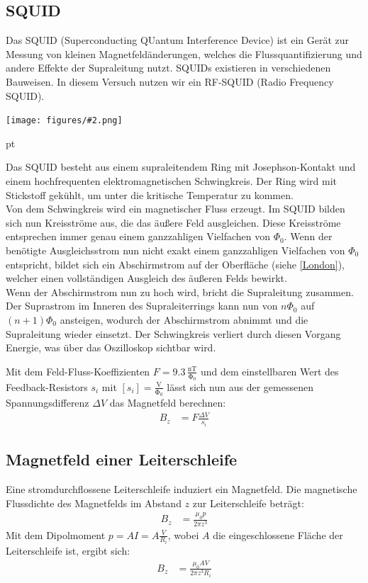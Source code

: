 \documentclass[12pt]{article}
\newcommand{\gra}[3][0.7]{
	\begin{minipage}[h!]{\textwidth}
		\centering
		\texttt{[image: figures/\#2.png]}
		\captionof{figure}{#3}
	\end{minipage}
	\vskip 30 pt
}
\begin{document}
\subsection{SQUID}
Das SQUID (Superconducting QUantum Interference Device) ist ein Gerät zur Messung von kleinen Magnetfeldänderungen, welches die Flussquantifizierung und andere Effekte der Supraleitung nutzt. SQUIDs existieren in verschiedenen Bauweisen. In diesem Versuch nutzen wir ein RF-SQUID (Radio Frequency SQUID).

\gra{squid}{Aufbau eines RF-SQUIDs}

Das SQUID besteht aus einem supraleitendem Ring mit Josephson-Kontakt und einem hochfrequenten elektromagnetischen Schwingkreis. Der Ring wird mit Stickstoff gekühlt, um unter die kritische Temperatur zu kommen.\\

Von dem Schwingkreis wird ein magnetischer Fluss erzeugt. Im SQUID bilden sich nun Kreisströme aus, die das äußere Feld ausgleichen. Diese Kreisströme entsprechen immer genau einem ganzzahligen Vielfachen von $\Phi_0$. Wenn der benötigte Ausgleichsstrom nun nicht exakt einem ganzzahligen Vielfachen von $\Phi_0$ entspricht, bildet sich ein Abschirmstrom auf der Oberfläche (siehe \ref{London}), welcher einen vollständigen Ausgleich des äußeren Felds bewirkt.\\

Wenn der Abschirmstrom nun zu hoch wird, bricht die Supraleitung zusammen. Der Suprastrom im Inneren des Supraleiterrings kann nun von $n\Phi_0$ auf $(n+1)\Phi_0$ ansteigen, wodurch der Abschirmstrom abnimmt und die Supraleitung wieder einsetzt. Der Schwingkreis verliert durch diesen Vorgang Energie, was über das Oszilloskop sichtbar wird.

Mit dem Feld-Fluss-Koeffizienten $F=9.3\,\mathrm{\frac{nT}{\Phi_0}}$ und dem einstellbaren Wert des Feedback-Resistors $s_i$ mit $[s_i]=\mathrm{\frac{V}{\Phi_0}}$ lässt sich nun aus der gemessenen Spannungsdifferenz $\Delta V$ das Magnetfeld berechnen:
\begin{align}
	B_z&=F\frac{\Delta V}{s_i}
\end{align}

\subsection{Magnetfeld einer Leiterschleife}
Eine stromdurchflossene Leiterschleife induziert ein Magnetfeld. Die magnetische Flussdichte des Magnetfelds im Abstand $z$ zur Leiterschleife beträgt:
\begin{align*}
	B_z&=\frac{\mu_0p}{2\pi z^3}
\end{align*}
Mit dem Dipolmoment $p=AI=A\frac V{R_i}$, wobei $A$ die eingeschlossene Fläche der Leiterschleife ist, ergibt sich:
\begin{align}
B_z&=\frac{\mu_0AV}{2\pi z^3R_i}
\end{align}
\end{document}
